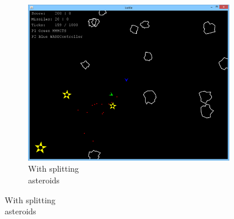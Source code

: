 \begin{figure}
	\begin{subfigure}[b]{0.15\textwidth}
		\center
		\includegraphics[scale=0.17]{resources/gamemode0}
		\caption{With splitting\\asteroids}
	\end{subfigure}
\end{figure}
	
